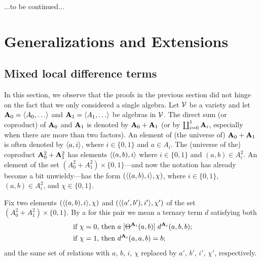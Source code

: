 ...to be continued...

\medskip
\begin{comment}
For reasons that will soon become clear, we let the universe of
\alg{A} be the set
$A =\{a_0, a_1, \dots, a_{n-1}, b_0, b_1, \dots, b_{n-1}\}$.
Define the following sets:
\begin{align*}
T_0 &= \{(a_0, b_0, 0), (a_1, b_1, 1)\}\\
T_1 &= \{(a_1, b_1, 1), (a_2, b_2, 0)\}\\
T_2 &= \{(a_2, b_2, 0), (a_3, b_3, 1)\}\\
\vdots\\
T_{n-1} &= \{(a_{n-2}, b_{n-2}, 1), (a_{n-1}, b_{n-1}, 0)\}.
\end{align*}
\end{comment}

\section{Generalizations and Extensions}


\subsection{Mixed local difference terms}
\label{sec:mixed-local-diff}
In this section, we observe that the proofs in the previous section
did not hinge on the fact that we only considered a single algebra.
Let $\mathcal{V}$ be a variety and let $\bA_0=\< A_0, \dots\>$ and  $\bA_1=\< A_1, \dots\>$ be
algebras in $\mathcal{V}$.
The direct sum (or coproduct) of $\mathbf{A}_0$ and
$\mathbf{A}_1$ is denoted by $\mathbf{A}_0 + \mathbf{A}_1$
(or by $\coprod_{i=0}^1 \mathbf{A}_i$, especially when there are more than two
factors).
An element of (the universe of)
$\mathbf{A}_0 + \mathbf{A}_1$ is often denoted by $\langle a, i\rangle$,
where $i\in \{0,1\}$ and $a \in A_i$.
The (universe of the) coproduct %
$\mathbf{A}_0^2 + \mathbf{A}_1^2$ has elements
$\langle(a,b), i\rangle$ where $i\in \{0,1\}$ and $(a,b) \in A_i^2$.
An element of  the set $(A_0^2 + A_1^2) \times \{0,1\}$---and
now the notation has already become a bit unwieldy---has
the form $(\langle(a,b), i\rangle, \chi)$, where $i\in \{0,1\}$, $(a,b) \in A_i^2$,
and $\chi\in \{0,1\}$.

Fix two elements $(\langle(a, b),i\rangle, \chi)$ and $(\langle(a', b'),i'\rangle, \chi')$ of the
set $(A_0^2 + A_1^2) \times \{0,1\}$.
By a  for this pair
we mean a ternary term $d$ satisfying both
\begin{align}
\text{ if $\chi=0$, then } & a \mathrel{[\Theta^{\mathbf{A}_i}(a,b)]} d^{\mathbf{A}_i}(a,b,b); \label{eq:mixed-diff-triple}\\
\text{ if $\chi=1$, then } &d^{\mathbf{A}_i}(a,a,b) = b; \nonumber
\end{align}
and the same set of relations with $a$, $b$, $i$, $\chi$ replaced
by $a'$, $b'$, $i'$, $\chi'$, respectively.

